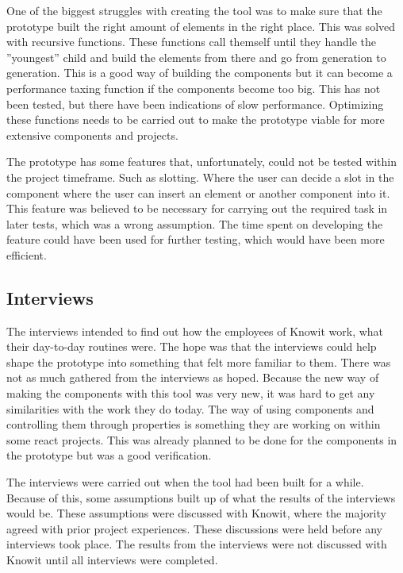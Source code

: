 One of the biggest struggles with creating the tool was to make sure that the prototype built the right amount of elements in the right place. This was solved with recursive functions. These functions call themself until they handle the ''youngest'' child and build the elements from there and go from generation to generation. This is a good way of building the components but it can become a performance taxing function if the components become too big. This has not been tested, but there have been indications of slow performance. Optimizing these functions needs to be carried out to make the prototype viable for more extensive components and projects.

The prototype has some features that, unfortunately, could not be tested within the project timeframe. Such as slotting. Where the user can decide a slot in the component where the user can insert an element or another component into it. This feature was believed to be necessary for carrying out the required task in later tests, which was a wrong assumption. The time spent on developing the feature could have been used for further testing, which would have been more efficient.



\subsection{Interviews}%
\label{sub:Interviews}

The interviews intended to find out how the employees of Knowit work, what their day-to-day routines were. The hope was that the interviews could help shape the prototype into something that felt more familiar to them. There was not as much gathered from the interviews as hoped. Because the new way of making the components with this tool was very new, it was hard to get any similarities with the work they do today. The way of using components and controlling them through properties is something they are working on within some react projects. This was already planned to be done for the components in the prototype but was a good verification. 

The interviews were carried out when the tool had been built for a while. Because of this, some assumptions built up of what the results of the interviews would be. These assumptions were discussed with Knowit, where the majority agreed with prior project experiences. These discussions were held before any interviews took place. The results from the interviews were not discussed with Knowit until all interviews were completed. 


